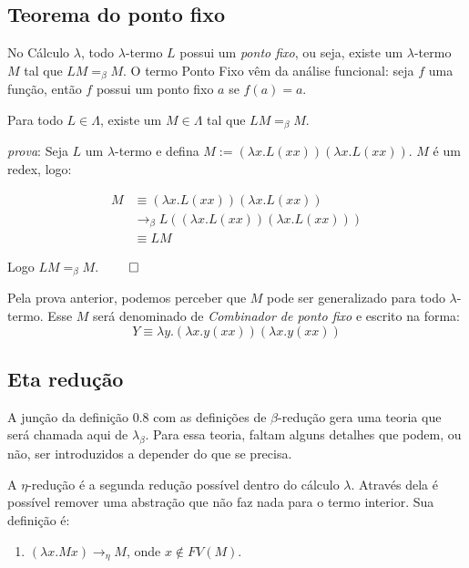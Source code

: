 \documentclass[../main.tex]{subfiles}
\begin{document}
\subsection{Teorema do ponto fixo}

No Cálculo $\lambda$, todo $\lambda$-termo $L$ possui um \emph{ponto fixo}, ou seja, existe um $\lambda$-termo $M$ tal que $LM =_{\beta} M$. O termo Ponto Fixo vêm da análise funcional: seja $f$ uma função, então $f$ possui um ponto fixo $a$ se $f(a) = a$. 

\begin{theorem}
    Para todo $L \in \Lambda$, existe um $M \in \Lambda$ tal que $LM =_{\beta} M$.
\end{theorem}

\emph{prova}: Seja $L$ um $\lambda$-termo e defina $M := (\lambda x . L (xx))(\lambda x . L (xx))$. $M$ é um redex, logo: 

\begin{equation*}
    \begin{split}
        M & \equiv (\lambda x . L (xx))(\lambda x . L (xx))
     \\   & \to_{\beta} L((\lambda x . L (xx))(\lambda x . L (xx)))
     \\   & \equiv LM
    \end{split}
\end{equation*}

Logo $LM =_{\beta} M$. $\qed$

Pela prova anterior, podemos perceber que $M$ pode ser generalizado para todo $\lambda$-termo. Esse $M$ será denominado de \emph{Combinador de ponto fixo} e escrito na forma: $$Y \equiv \lambda y . (\lambda x . y(xx))(\lambda x . y(xx)) $$

\subsection{Eta redução}

A junção da definição 0.8 com as definições de $\beta$-redução gera uma teoria que será chamada aqui de $\lambda_{\beta}$. Para essa teoria, faltam alguns detalhes que podem, ou não, ser introduzidos a depender do que se precisa.

A $\eta$-redução é a segunda redução possível dentro do cálculo $\lambda$. Através dela é possível remover uma abstração que não faz nada para o termo interior. Sua definição é:

\begin{definition}
    \hfill
    \begin{enumerate}
        \item $(\lambda x . M x) \rightarrow_{\eta} M$, onde $x \not\in FV(M)$.
    \end{enumerate}
\end{definition}
\end{document}

